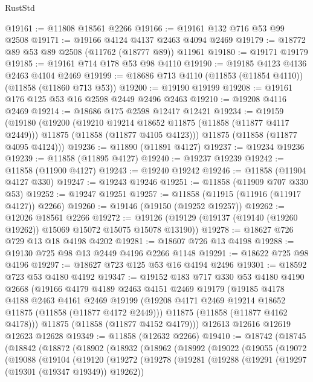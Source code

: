 \begin{lexlean}{RustStd}
\begin{coremodule}
@19161 := @11808 @18561 @2266
@19166 := @19161 @132 @716 @53 @99 @2508
@19171 := @19166 @4124 @4137 @2463 @4094 @2469
@19179 := @18772 @89 @53 @89 @2508 (@11762 (@18777 @89)) @11961
@19180 := @19171 @19179
@19185 := @19161 @714 @178 @53 @98 @4110
@19190 := @19185 @4123 @4136 @2463 @4104 @2469
@19199 := @18686 @713 @4110 (@11853 (@11854 @4110)) (@11858 (@11860 @713 @53))
@19200 := @19190 @19199
@19208 := @19161 @176 @125 @53 @16 @2598 @2449 @2496 @2463
@19210 := @19208 @4116 @2469
@19214 := @18686 @175 @2598 @12417 @12421
@19234 := @19159
    (@19180
      (@19200
        (@19210 @19214 @18652 @11875 (@11858 (@11877 @4117 @2449)))
        @11875
        (@11858 (@11877 @4105 @4123)))
      @11875
      (@11858 (@11877 @4095 @4124)))
@19236 := @11890 (@11891 @4127)
@19237 := @19234 @19236
@19239 := @11858 (@11895 @4127)
@19240 := @19237 @19239
@19242 := @11858 (@11900 @4127)
@19243 := @19240 @19242
@19246 := @11858 (@11904 @4127 @330)
@19247 := @19243 @19246
@19251 := @11858 (@11909 @707 @330 @53)
@19252 := @19247 @19251
@19257 := @11858 (@11915 (@11916 (@11917 @4127)) @2266)
@19260 := @19146 (@19150 (@19252 @19257))
@19262 := @12026 @18561 @2266
@19272 := @19126 (@19129 (@19137 (@19140 (@19260 @19262)) @15069 @15072 @15075 @15078 @13190))
@19278 := @18627 @726 @729 @13 @18 @4198 @4202
@19281 := @18607 @726 @13 @4198
@19288 := @19130 @725 @98 @13 @2449 @4196 @2266 @1148
@19291 := @18622 @725 @98 @4196
@19297 := @18627 @723 @125 @53 @16 @4194 @2496
@19301 := @18592 @723 @53 @4180 @4192
@19347 := @19152
    @183
    @717
    @330
    @53
    @4180
    @4190
    @2668
    (@19166
      @4179
      @4189
      @2463
      @4151
      @2469
      @19179
      (@19185
        @4178
        @4188
        @2463
        @4161
        @2469
        @19199
        (@19208 @4171 @2469 @19214 @18652 @11875 (@11858 (@11877 @4172 @2449)))
        @11875
        (@11858 (@11877 @4162 @4178)))
      @11875
      (@11858 (@11877 @4152 @4179)))
    @12613
    @12616
    @12619
    @12623
    @12628
@19349 := @11858 (@12632 @2266)
@19410 := @18742
    (@18745
      (@18842
        (@18872
          (@18902
            (@18932
              (@18962
                (@18992
                  (@19022
                    (@19055
                      (@19072
                        (@19088
                          (@19104
                            (@19120
                              (@19272
                                (@19278
                                  (@19281
                                    (@19288
                                      (@19291 (@19297 (@19301 (@19347 @19349)) @19262))

\end{coremodule}
\end{lexlean}
